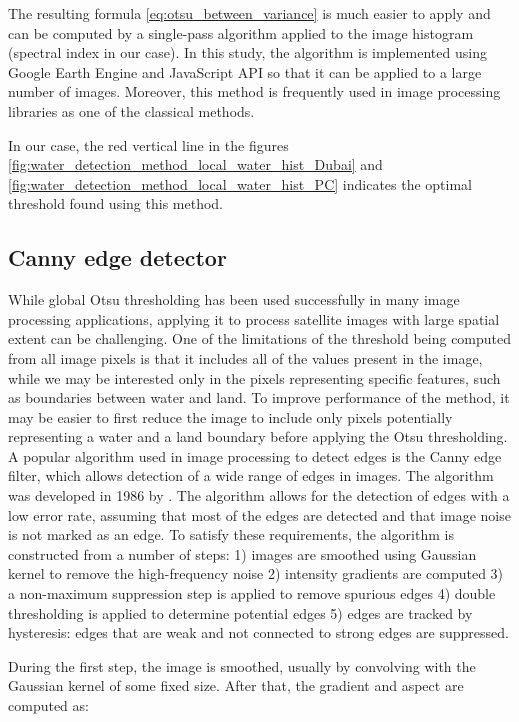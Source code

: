 The resulting formula \ref{eq:otsu_between_variance} is much easier to apply and can be computed by a single-pass algorithm applied to the image histogram (spectral index in our case). In this study, the algorithm is implemented using Google Earth Engine and JavaScript API so that it can be applied to a large number of images. Moreover, this method is frequently used in image processing libraries as one of the classical methods.

In our case, the red vertical line in the figures \ref{fig:water_detection_method_local_water_hist_Dubai} and \ref{fig:water_detection_method_local_water_hist_PC} indicates the optimal threshold found using this method.

\subsection{Canny edge detector}

While global Otsu thresholding has been used successfully in many image processing applications, applying it to process satellite images with large spatial extent can be challenging. One of the limitations of the threshold being computed from all image pixels is that it includes all of the values present in the image, while we may be interested only in the pixels representing specific features, such as boundaries between water and land. To improve performance of the method, it may be easier to first reduce the image to include only pixels potentially representing a water and a land boundary before applying the Otsu thresholding. A popular algorithm used in image processing to detect edges is the Canny edge filter, which allows detection of a wide range of edges in images. The algorithm was developed in 1986 by \citet{canny1986computational}. The algorithm allows for the detection of edges with a low error rate, assuming that most of the edges are detected and that image noise is not marked as an edge. To satisfy these requirements, the algorithm is constructed from a number of steps: 1) images are smoothed using Gaussian kernel to remove the high-frequency noise 2) intensity gradients are computed 3) a non-maximum suppression step is applied to remove spurious edges 4) double thresholding is applied to determine potential edges 5) edges are tracked by hysteresis: edges that are weak and not connected to strong edges are suppressed.

During the first step, the image is smoothed, usually by convolving with the Gaussian kernel of some fixed size. After that, the gradient and aspect are computed as:

